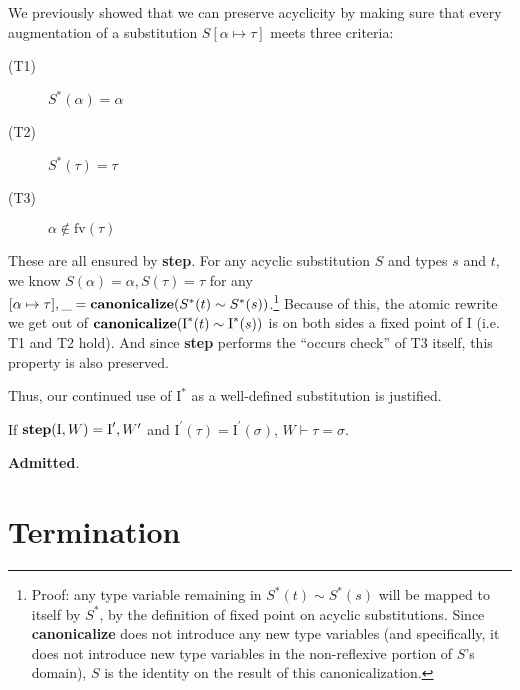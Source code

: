 \documentclass[10pt, letterpaper, oneside]{article}
\newcommand{\inertset}{\text{I}}
\newcommand{\fv}{\mathrm{fv}}
\newcommand{\Admitted}{{\color{red}\bf Admitted}}
\begin{document}
We previously showed that we can preserve acyclicity by making sure that every augmentation of a substitution \(S[\alpha \mapsto \tau]\) meets three criteria:
\begin{description}
\item[(T1)] \(S^\ast(\alpha) = \alpha\)
\item[(T2)] \(S^\ast(\tau) = \tau\)
\item[(T3)] \(\alpha \notin \fv(\tau)\)
\end{description}
These are all ensured by \textbf{step}. For any acyclic substitution \(S\) and types \(s\) and \(t\), we know \(S(\alpha) = \alpha, S(\tau) = \tau\) for any \([\alpha \mapsto \tau], \_ = \text{\bf canonicalize}(S^\ast(t) \sim S^\ast(s))\).\footnote{Proof: any type variable remaining in \(S^\ast(t) \sim S^\ast(s)\) will be mapped to itself by \(S^\ast\), by the definition of fixed point on acyclic substitutions. Since \textbf{canonicalize} does not introduce any new type variables (and specifically, it does not introduce new type variables in the non-reflexive portion of \(S\)'s domain), \(S\) is the identity on the result of this canonicalization.} Because of this, the atomic rewrite we get out of \(\text{\bf canonicalize}(\inertset^\ast(t) \sim \inertset^\ast(s))\) is on both sides a fixed point of \(\inertset\) (i.e. T1 and T2 hold). And since \textbf{step} performs the ``occurs check'' of T3 itself, this property is also preserved.

Thus, our continued use of \(\inertset^\ast\) as a well-defined substitution is justified.

\begin{theorem}
  \label{theorem:step-sound}
  If \(\text{\bf step}(\inertset, W) = \inertset^\prime, W^\prime\) and \(\inertset^\prime(\tau) = \inertset^\prime(\sigma)\), \(W \vdash \tau = \sigma\).
\end{theorem}

\Admitted.


\section{Termination}
\end{document}
